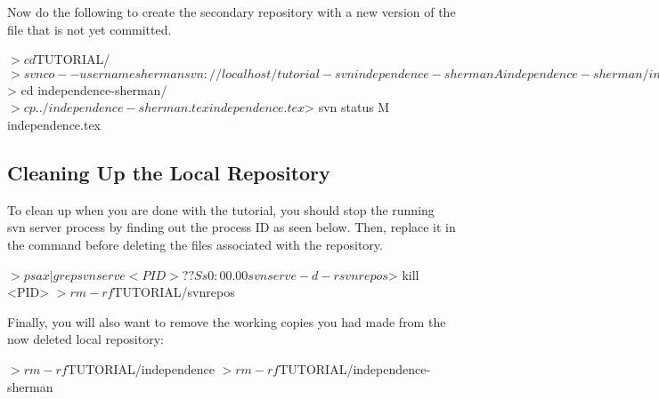 Now do the following to create the secondary repository with a new version of the file that is not yet committed.
\begin{CodeVerbatim}
$> cd $TUTORIAL/
$> svn co --username sherman svn://localhost/tutorial-svn independence-sherman
A    independence-sherman/independence.tex
Checked out revision 6.
$> cd independence-sherman/
$> cp ../independence-sherman.tex independence.tex
$> svn status
M       independence.tex
\end{CodeVerbatim}

\subsection{Cleaning Up the Local Repository}

To clean up when you are done with the tutorial, you should stop the running svn server process by finding out the process ID  as seen below.  Then, replace it in the  command before deleting the files associated with the repository.
\begin{CodeVerbatim}[commandchars=\\\{\}]
$> ps ax | grep svnserve
 <PID>   ??  Ss     0:00.00 svnserve -d -r svnrepos
$> kill <PID>
$> rm -rf $TUTORIAL/svnrepos
\end{CodeVerbatim}

Finally, you will also want to remove the working copies you had made from the now deleted local repository:
\begin{CodeVerbatim}
$> rm -rf $TUTORIAL/independence
$> rm -rf $TUTORIAL/independence-sherman
\end{CodeVerbatim}
